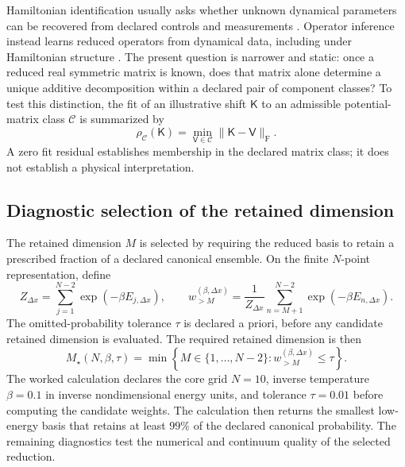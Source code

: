 \documentclass[11pt]{article}
\newcommand{\fro}{\mathrm{F}}
\newcommand{\mat}[1]{\mathsf{#1}}
\begin{document}
Hamiltonian identification usually asks whether unknown dynamical parameters can be
recovered from declared controls and measurements
\cite{leBrisEtAl2007,wangEtAl2020}. Operator inference instead learns reduced
operators from dynamical data, including under Hamiltonian structure
\cite{sharmaWangKramer2022,kramerPeherstorferWillcox2024}. The present question is
narrower and static: once a reduced real symmetric matrix is known, does that matrix
alone determine a unique additive decomposition within a declared pair of component
classes? To test this distinction, the fit of an illustrative shift $\mat{K}$ to an
admissible potential-matrix class $\mathcal C$ is summarized by
\begin{equation}
 \rho_{\mathcal C}(\mat{K})
 =\min_{\mat{V}\in\mathcal C}\lVert\mat{K}-\mat{V}\rVert_{\fro}.
 \label{eq:model-class-fit-diagnostic}
\end{equation}
A zero fit residual establishes membership in the declared matrix class; it does not
establish a physical interpretation.

\subsection{Diagnostic selection of the retained dimension}

The retained dimension $M$ is selected by requiring the reduced basis to retain a
prescribed fraction of a declared canonical ensemble. On the finite $N$-point representation,
define
\begin{equation}
 Z_{\Delta x}=\sum_{j=1}^{N-2}\exp(-\beta E_{j,\Delta x}),
 \qquad
 w_{>M}^{(\beta,\Delta x)}
 =\frac{1}{Z_{\Delta x}}
  \sum_{n=M+1}^{N-2}\exp(-\beta E_{n,\Delta x}).
 \label{eq:represented-omitted-canonical-weight}
\end{equation}
The omitted-probability tolerance $\tau$ is declared a priori, before any candidate
retained dimension is evaluated. The required retained dimension is then
\begin{equation}
 M_{\star}(N,\beta,\tau)
 =\min\left\{M\in\{1,\ldots,N-2\}:
 w_{>M}^{(\beta,\Delta x)}\leq\tau\right\}.
 \label{eq:retained-dimension-rule}
\end{equation}
The worked calculation declares the core grid $N=10$, inverse temperature $\beta=0.1$
in inverse nondimensional energy units, and tolerance $\tau=0.01$ before computing the
candidate weights. The calculation then returns the smallest low-energy basis that
retains at least $99\%$ of the declared canonical probability. The remaining diagnostics test the numerical and continuum
quality of the selected reduction.
\end{document}
